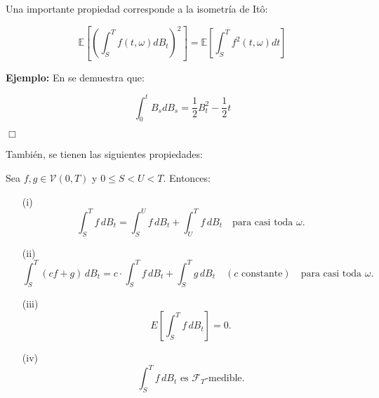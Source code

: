 Una importante propiedad corresponde a la isometría de Itô:

\begin{coro}
	\[
		\mathbb{E} \left[ \left( \int_S^T f(t, \omega) dB_t \right)^2 \right] = \mathbb{E} \left[ \int_S^T f^2 (t,\omega) dt \right]
	\]
\end{coro}

\textbf{Ejemplo:} En \cite{EDE_Oksendal} se demuestra que:

\[
	\int_0^t B_s dB_s = \frac{1}{2} B^2_t - \frac{1}{2}t
\]

\begin{flushright}
	$\Box$
\end{flushright}

También, se tienen las siguientes propiedades:

\begin{theorem}
Sea $ f, g \in \mathcal{V}(0, T) $ y  $ 0 \leq S < U < T $. Entonces:

\begin{enumerate}
    \item[(i)] \[ 
        \int_{S}^{T} f \, dB_t = \int_{S}^{U} f \, dB_t + \int_{U}^{T} f \, dB_t \quad \text{para casi toda } \omega.
    \]
    
    \item[(ii)] \[
        \int_{S}^{T} (c f + g) \, dB_t = c \cdot \int_{S}^{T} f \, dB_t + \int_{S}^{T} g \, dB_t \quad (c \text{ constante}) \quad \text{para casi toda } \omega.
    \]
    
    \item[(iii)] \[
        E \left[ \int_{S}^{T} f \, dB_t \right] = 0.
    \]
    
    \item[(iv)] \[
        \int_{S}^{T} f \, dB_t \text{ es } \mathcal{F}_T\text{-medible}.
    \]
\end{enumerate}
\end{theorem}

